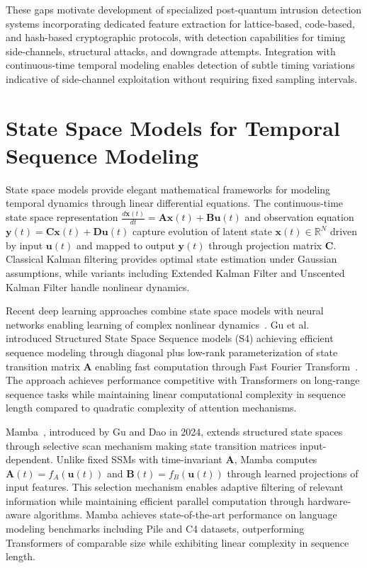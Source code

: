 These gaps motivate development of specialized post-quantum intrusion detection systems incorporating dedicated feature extraction for lattice-based, code-based, and hash-based cryptographic protocols, with detection capabilities for timing side-channels, structural attacks, and downgrade attempts. Integration with continuous-time temporal modeling enables detection of subtle timing variations indicative of side-channel exploitation without requiring fixed sampling intervals.

\section{State Space Models for Temporal Sequence Modeling}
\label{sec:lit_ssm}

State space models provide elegant mathematical frameworks for modeling temporal dynamics through linear differential equations. The continuous-time state space representation $\frac{d\mathbf{x}(t)}{dt} = \mathbf{A}\mathbf{x}(t) + \mathbf{B}\mathbf{u}(t)$ and observation equation $\mathbf{y}(t) = \mathbf{C}\mathbf{x}(t) + \mathbf{D}\mathbf{u}(t)$ capture evolution of latent state $\mathbf{x}(t) \in \mathbb{R}^N$ driven by input $\mathbf{u}(t)$ and mapped to output $\mathbf{y}(t)$ through projection matrix $\mathbf{C}$. Classical Kalman filtering provides optimal state estimation under Gaussian assumptions, while variants including Extended Kalman Filter and Unscented Kalman Filter handle nonlinear dynamics.

Recent deep learning approaches combine state space models with neural networks enabling learning of complex nonlinear dynamics~\cite{chen2018neural}. Gu et al.~\cite{gu2022efficiently} introduced Structured State Space Sequence models (S4) achieving efficient sequence modeling through diagonal plus low-rank parameterization of state transition matrix $\mathbf{A}$ enabling fast computation through Fast Fourier Transform~\cite{cooley1965algorithm}. The approach achieves performance competitive with Transformers on long-range sequence tasks while maintaining linear computational complexity in sequence length compared to quadratic complexity of attention mechanisms.

Mamba~\cite{gu2024mamba}, introduced by Gu and Dao in 2024, extends structured state spaces through selective scan mechanism making state transition matrices input-dependent. Unlike fixed SSMs with time-invariant $\mathbf{A}$, Mamba computes $\mathbf{A}(t) = f_A(\mathbf{u}(t))$ and $\mathbf{B}(t) = f_B(\mathbf{u}(t))$ through learned projections of input features. This selection mechanism enables adaptive filtering of relevant information while maintaining efficient parallel computation through hardware-aware algorithms. Mamba achieves state-of-the-art performance on language modeling benchmarks including Pile and C4 datasets, outperforming Transformers of comparable size while exhibiting linear complexity in sequence length.

